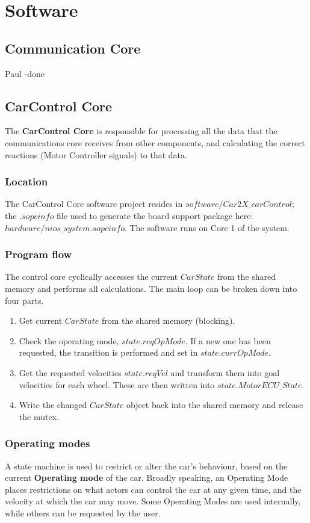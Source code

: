 \chapter{Software}

\section{Communication Core}
Paul -done


\section{CarControl Core}
The \textbf{CarControl Core} is responsible for processing all the data that the communications core receives from other components, and calculating the correct reactions (Motor Controller signals) to that data. 

\subsection{Location}
The CarControl Core software project resides in $software/Car2X\_carControl$; the $.sopcinfo$ file used to generate the board support package here: \\$hardware/nios\_system.sopcinfo$. The software runs on Core 1 of the system.

\subsection{Program flow}
The control core cyclically accesses the current $CarState$ from the shared memory and performs all calculations. The main loop can be broken down into four parts.

\begin{enumerate}
\item Get current $CarState$ from the shared memory (blocking).
\item Check the operating mode, $state.reqOpMode$. If a new one has been requested, the transition is performed and set in $state.currOpMode$.
\item Get the requested velocities $state.reqVel$ and transform them into goal velocities for each wheel. These are then written into $state.MotorECU\_State$.
\item Write the changed $CarState$ object back into the shared memory and release the mutex.
\end{enumerate}

\subsection{Operating modes}
A state machine is used to restrict or alter the car's behaviour, based on the current \textbf{Operating mode} of the car. Broadly speaking, an Operating Mode places restrictions on what actors can control the car at any given time, and the velocity at which the car may move. Some Operating Modes are used internally, while others can be requested by the user.

